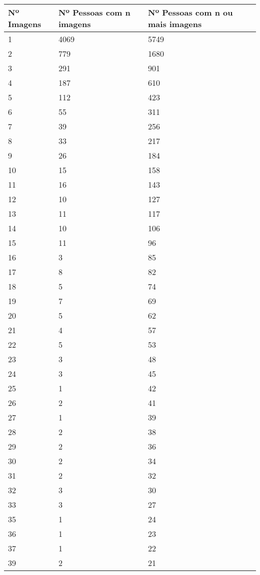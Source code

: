 \begin{table}
    \begin{tabular}{lll}
    \hline 
	Nº Imagens & Nº Pessoas com n imagens & Nº Pessoas com n ou mais imagens \\ \hline
	1     & 4069 & 5749 \\
    2     & 779 & 1680 \\ 
    3     & 291 & 901 \\ 
    4     & 187 & 610 \\ 
    5     & 112 & 423 \\ 
    6     & 55 & 311 \\ 
    7     & 39 & 256 \\ 
    8     & 33 & 217 \\ 
    9     & 26 & 184 \\ 
    10     & 15 & 158 \\ 
    11     & 16 & 143 \\ 
    12     & 10 & 127 \\ 
    13     & 11 & 117 \\ 
    14     & 10 & 106 \\ 
    15     & 11 & 96 \\ 
    16     & 3 & 85 \\ 
    17     & 8 & 82 \\ 
    18     & 5 & 74 \\ 
    19     & 7 & 69 \\ 
    20     & 5 & 62 \\ 
    21     & 4 & 57 \\ 
    22     & 5 & 53 \\ 
    23     & 3 & 48 \\ 
    24     & 3 & 45 \\ 
    25     & 1 & 42 \\ 
    26     & 2 & 41 \\ 
    27     & 1 & 39 \\ 
    28     & 2 & 38 \\ 
    29     & 2 & 36 \\ 
    30     & 2 & 34 \\ 
    31     & 2 & 32 \\ 
    32     & 3 & 30 \\ 
    33     & 3 & 27 \\ 
    35     & 1 & 24 \\ 
    36     & 1 & 23 \\ 
    37     & 1 & 22 \\ 
    39     & 2 & 21 \\ 

\end{tabular}
\end{table}
